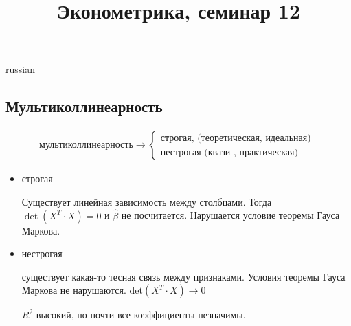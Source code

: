 \documentclass{article}
\begin{document}
\title{\foreignlanguage{russian}{Эконометрика, семинар 12}}
\maketitle
\begin{otherlanguage*}{russian}
\subsection*{Мультиколлинеарность}
\begin{align*}
\text{мультиколлинеарность} \rightarrow 
\begin{cases}
\text{строгая, (теоретическая, идеальная) } \\
\text{нестрогая (квази-, практическая)} 
\end{cases}
\end{align*} 
\begin{itemize}
\item строгая 

Существует линейная зависимость между столбцами. Тогда $ \det (X^T \cdot X) = 0 $ и $ \hat \beta $ не посчитается. Нарушается условие теоремы Гауса Маркова. 

\item нестрогая 

существует какая-то тесная связь между признаками. Условия теоремы Гауса Маркова не нарушаются. 
$ \text{det} (X^T \cdot X) \rightarrow 0 $ 

$ R ^ 2 $ высокий, но почти все коэффициенты незначимы.  


\end{itemize}
\end{otherlanguage*}
\end{document}
